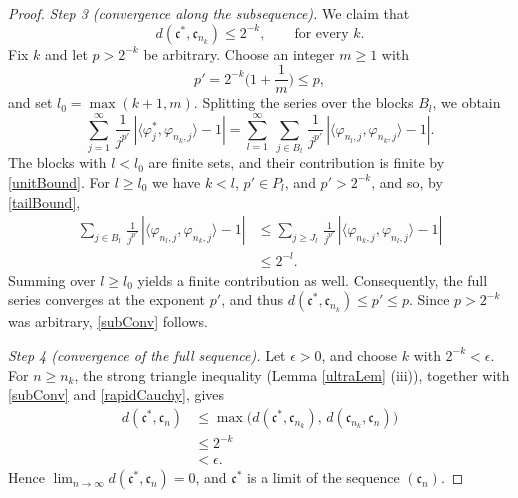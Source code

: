 \documentclass[10pt,a4paper]{amsart}
\def\fc{{\mathfrak{c}}}
\begin{document}
\begin{proof}
\smallskip\noindent\textit{Step 3 (convergence along the subsequence).}
We claim that
\begin{equation}\label{subConv}
d(\fc^\ast,\fc_{n_k})\leq 2^{-k},\qquad\text{for every }k.
\end{equation}
Fix $k$ and let $p>2^{-k}$ be arbitrary. Choose an integer $m\geq1$ with
\begin{equation*}
p'=2^{-k}\Big(1+\frac1m\Big)\leq p,
\end{equation*}
and set $l_0=\max(k+1,m)$. Splitting the series over the blocks $B_l$, we obtain
\begin{equation*}
\sum_{j=1}^\infty\,\frac{1}{j^{p'}}\,|\langle \varphi^\ast_{j},\varphi_{n_k,j}\rangle-1|
=\sum_{l=1}^\infty\;\sum_{j\in B_l}\,\frac{1}{j^{p'}}\,|\langle \varphi_{n_l,j},\varphi_{n_k,j}\rangle-1|.
\end{equation*}
The blocks with $l<l_0$ are finite sets, and their contribution is finite by \eqref{unitBound}. For $l\geq l_0$ we have $k<l$, $p'\in P_l$, and $p'>2^{-k}$, and so, by \eqref{tailBound},
\begin{equation*}
\begin{split}
\sum_{j\in B_l}\,\frac{1}{j^{p'}}\,|\langle \varphi_{n_l,j},\varphi_{n_k,j}\rangle-1|
&\leq\sum_{j\geq J_l}\,\frac{1}{j^{p'}}\,|\langle \varphi_{n_k,j},\varphi_{n_l,j}\rangle-1|\\
&\leq 2^{-l}.
\end{split}
\end{equation*}
Summing over $l\geq l_0$ yields a finite contribution as well. Consequently, the full series converges at the exponent $p'$, and thus $d(\fc^\ast,\fc_{n_k})\leq p'\leq p$. Since $p>2^{-k}$ was arbitrary, \eqref{subConv} follows.

\smallskip\noindent\textit{Step 4 (convergence of the full sequence).}
Let $\epsilon>0$, and choose $k$ with $2^{-k}<\epsilon$. For $n\geq n_k$, the strong triangle inequality (Lemma \ref{ultraLem} (iii)), together with \eqref{subConv} and \eqref{rapidCauchy}, gives
\begin{equation*}
\begin{split}
d(\fc^\ast,\fc_n)&\leq\max\big(d(\fc^\ast,\fc_{n_k}),\,d(\fc_{n_k},\fc_n)\big)\\
&\leq 2^{-k}\\
&<\epsilon.
\end{split}
\end{equation*}
Hence $\lim_{n\to\infty}d(\fc^\ast,\fc_n)=0$, and $\fc^\ast$ is a limit of the sequence $(\fc_n)$.
\end{proof}
\end{document}
